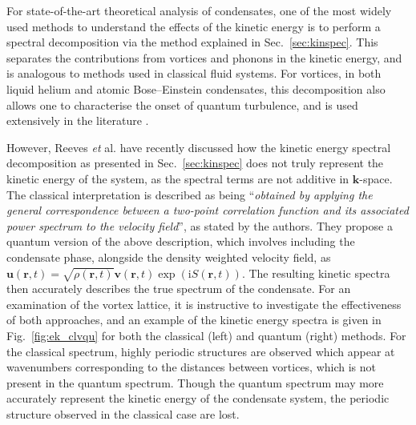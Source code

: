 For state-of-the-art theoretical analysis of condensates, one of the most widely used methods to understand the effects of the kinetic energy is to perform a spectral decomposition via the method explained in Sec.~\ref{sec:kinspec}. This separates the contributions from vortices and phonons in the kinetic energy, and is analogous to methods used in classical fluid systems. For vortices, in both liquid helium and atomic Bose--Einstein condensates, this decomposition also allows one to characterise the onset of quantum turbulence, and is used extensively in the literature \cite{VTX:Kobayashi_prl_2005,VTX:Tsubota_jphys_2009,CT:Bradley_prx_2012,VTX:White_jphys_2014,VTX:Skaugen_pre_2016}. %

However, Reeves {\it et} al. \cite{VTX:Reeves_pra_2014} have recently discussed how the kinetic energy spectral decomposition as presented in Sec.~\ref{sec:kinspec} does not truly represent the kinetic energy of the system, as the spectral terms are not additive in $\mathbf{k}$-space. The classical interpretation is described as being ``\textit{obtained by applying the general correspondence between a two-point correlation function and its associated
power spectrum to the velocity field}'', as stated by the authors. They propose a quantum version of the above description, which involves including the condensate phase, alongside the density weighted velocity field, as $\mathbf{u}(\mathbf{r},t) = \sqrt{\rho(\mathbf{r},t)}\mathbf{v}(\mathbf{r},t)\exp\left(\textrm{i}S(\mathbf{r},t)\right)$. The resulting kinetic spectra then accurately describes the true spectrum of the condensate. For an examination of the vortex lattice, it is instructive to investigate the effectiveness of both approaches, and an example of the kinetic energy spectra is given in Fig.~\ref{fig:ek_clvqu} for both the classical (left) and quantum (right) methods. For the classical spectrum, highly periodic structures are observed which appear at wavenumbers corresponding to the distances between vortices, which is not present in the quantum spectrum. Though the quantum spectrum may more accurately represent the kinetic energy of the condensate system, the periodic structure observed in the classical case are lost.


